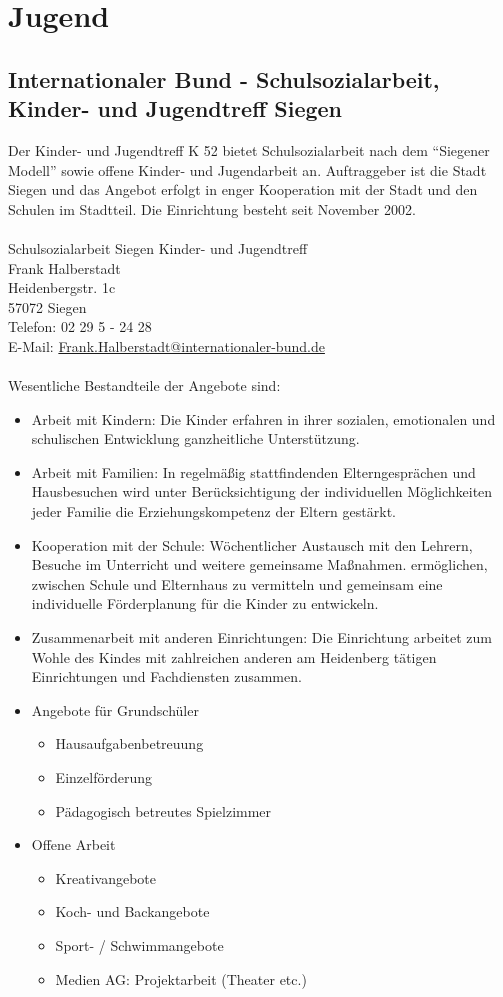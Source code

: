 \chapter{Jugend}

\section{Internationaler Bund - Schulsozialarbeit, Kinder- und Jugendtreff Siegen}
Der Kinder- und Jugendtreff K 52 bietet Schulsozialarbeit nach dem \enquote{Siegener Modell} sowie offene Kinder- und Jugendarbeit an. Auftraggeber ist die Stadt Siegen und das Angebot erfolgt in enger Kooperation mit der Stadt und den Schulen im Stadtteil. Die Einrichtung besteht seit November 2002.\\
\\
Schulsozialarbeit Siegen Kinder- und Jugendtreff\\
Frank Halberstadt\\
Heidenbergstr. 1c\\
57072 Siegen\\
Telefon: 02 29 5 - 24 28\\
E-Mail: \href{Frank.Halberstadt@internationaler-bund.de}{Frank.Halberstadt@internationaler-bund.de}\\
\\
Wesentliche Bestandteile der Angebote sind:
\begin{itemize}
	\item Arbeit mit Kindern: Die Kinder erfahren in ihrer sozialen, emotionalen und schulischen Entwicklung ganzheitliche Unterstützung.
	\item Arbeit mit Familien: In regelmäßig stattfindenden Elterngesprächen und Hausbesuchen wird unter Berücksichtigung der individuellen Möglichkeiten jeder Familie die Erziehungskompetenz der Eltern gestärkt.
	\item Kooperation mit der Schule: Wöchentlicher Austausch mit den Lehrern, Besuche im Unterricht und weitere gemeinsame Maßnahmen. ermöglichen, zwischen Schule und Elternhaus zu vermitteln und gemeinsam eine individuelle Förderplanung für die Kinder zu entwickeln.
	\item Zusammenarbeit mit anderen Einrichtungen: Die Einrichtung arbeitet zum Wohle des Kindes mit zahlreichen anderen am Heidenberg tätigen Einrichtungen und Fachdiensten zusammen.
	\item Angebote für Grundschüler
	\begin{itemize}
		\item Hausaufgabenbetreuung
		\item Einzelförderung
		\item Pädagogisch betreutes Spielzimmer
	\end{itemize}
	\item Offene Arbeit
	\begin{itemize}
		\item Kreativangebote
		\item Koch- und Backangebote
		\item Sport- / Schwimmangebote
		\item Medien AG: Projektarbeit (Theater etc.)
	\end{itemize}
\end{itemize}

